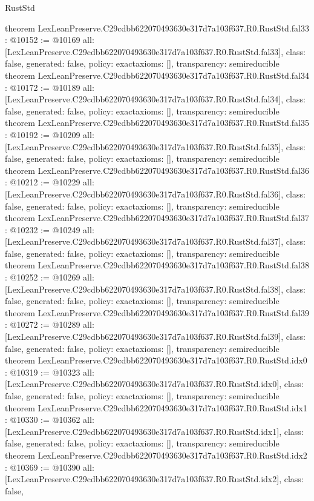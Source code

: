 \begin{lexlean}{RustStd}
\begin{coremodule}
theorem LexLeanPreserve.C29cdbb622070493630e317d7a103f637.R0.RustStd.fal33 : @10152 := @10169 {
  all: [LexLeanPreserve.C29cdbb622070493630e317d7a103f637.R0.RustStd.fal33],
  class: false,
  generated: false,
  policy: exact{axioms: []},
  transparency: semireducible
}
theorem LexLeanPreserve.C29cdbb622070493630e317d7a103f637.R0.RustStd.fal34 : @10172 := @10189 {
  all: [LexLeanPreserve.C29cdbb622070493630e317d7a103f637.R0.RustStd.fal34],
  class: false,
  generated: false,
  policy: exact{axioms: []},
  transparency: semireducible
}
theorem LexLeanPreserve.C29cdbb622070493630e317d7a103f637.R0.RustStd.fal35 : @10192 := @10209 {
  all: [LexLeanPreserve.C29cdbb622070493630e317d7a103f637.R0.RustStd.fal35],
  class: false,
  generated: false,
  policy: exact{axioms: []},
  transparency: semireducible
}
theorem LexLeanPreserve.C29cdbb622070493630e317d7a103f637.R0.RustStd.fal36 : @10212 := @10229 {
  all: [LexLeanPreserve.C29cdbb622070493630e317d7a103f637.R0.RustStd.fal36],
  class: false,
  generated: false,
  policy: exact{axioms: []},
  transparency: semireducible
}
theorem LexLeanPreserve.C29cdbb622070493630e317d7a103f637.R0.RustStd.fal37 : @10232 := @10249 {
  all: [LexLeanPreserve.C29cdbb622070493630e317d7a103f637.R0.RustStd.fal37],
  class: false,
  generated: false,
  policy: exact{axioms: []},
  transparency: semireducible
}
theorem LexLeanPreserve.C29cdbb622070493630e317d7a103f637.R0.RustStd.fal38 : @10252 := @10269 {
  all: [LexLeanPreserve.C29cdbb622070493630e317d7a103f637.R0.RustStd.fal38],
  class: false,
  generated: false,
  policy: exact{axioms: []},
  transparency: semireducible
}
theorem LexLeanPreserve.C29cdbb622070493630e317d7a103f637.R0.RustStd.fal39 : @10272 := @10289 {
  all: [LexLeanPreserve.C29cdbb622070493630e317d7a103f637.R0.RustStd.fal39],
  class: false,
  generated: false,
  policy: exact{axioms: []},
  transparency: semireducible
}
theorem LexLeanPreserve.C29cdbb622070493630e317d7a103f637.R0.RustStd.idx0 : @10319 := @10323 {
  all: [LexLeanPreserve.C29cdbb622070493630e317d7a103f637.R0.RustStd.idx0],
  class: false,
  generated: false,
  policy: exact{axioms: []},
  transparency: semireducible
}
theorem LexLeanPreserve.C29cdbb622070493630e317d7a103f637.R0.RustStd.idx1 : @10330 := @10362 {
  all: [LexLeanPreserve.C29cdbb622070493630e317d7a103f637.R0.RustStd.idx1],
  class: false,
  generated: false,
  policy: exact{axioms: []},
  transparency: semireducible
}
theorem LexLeanPreserve.C29cdbb622070493630e317d7a103f637.R0.RustStd.idx2 : @10369 := @10390 {
  all: [LexLeanPreserve.C29cdbb622070493630e317d7a103f637.R0.RustStd.idx2],
  class: false,
}
\end{coremodule}
\end{lexlean}
